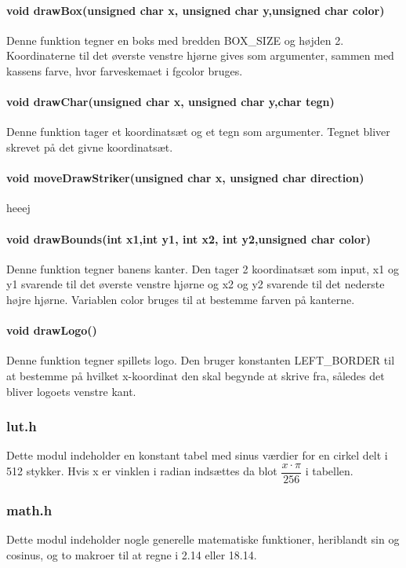 \paragraph{
void drawBox(unsigned char x, unsigned char y,unsigned char color)}
Denne funktion tegner en boks med bredden BOX\_SIZE og højden 2. Koordinaterne til det øverste venstre hjørne gives som argumenter, sammen med kassens farve, hvor farveskemaet i fgcolor bruges.

\paragraph{void drawChar(unsigned char x, unsigned char y,char tegn)}
Denne funktion tager et koordinatsæt og et tegn som argumenter. Tegnet bliver skrevet på det givne koordinatsæt.

\paragraph{void moveDrawStriker(unsigned char x, unsigned char direction)}
heeej

\paragraph{void drawBounds(int x1,int y1, int x2, int y2,unsigned char color)}
Denne funktion tegner banens kanter. Den tager 2 koordinatsæt som input, x1 og y1 svarende til det øverste venstre hjørne og  x2 og y2 svarende til det nederste højre hjørne. Variablen color bruges til at bestemme farven på kanterne. 

\paragraph{void drawLogo()}
Denne funktion tegner spillets logo. Den bruger konstanten LEFT\_BORDER til at bestemme på hvilket x-koordinat den skal begynde at skrive fra, således det bliver logoets venstre kant.
\subsubsection{lut.h}
\label{lut}
Dette modul indeholder en konstant tabel med sinus værdier for en cirkel delt i 512 stykker. Hvis x er vinklen i radian indsættes da blot $\dfrac{x\cdot \pi}{256}$ i tabellen.
\subsubsection{math.h}
Dette modul indeholder nogle generelle matematiske funktioner, heriblandt sin og cosinus, og to makroer til at regne i 2.14 eller 18.14.
